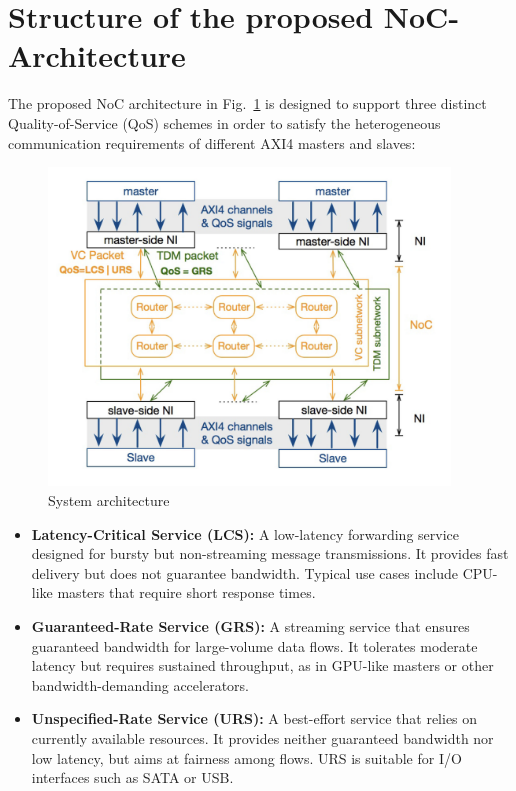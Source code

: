 \section{Structure of the proposed NoC-Architecture}

The proposed NoC architecture in Fig.~\ref{fig:System_Architecture} is designed to support three distinct Quality-of-Service (QoS) schemes in order to satisfy the heterogeneous communication requirements of different AXI4 masters and slaves:

\begin{figure}[htbp]
    \centering
    \includegraphics[width=0.95\textwidth]{img/System Architecture.png}
    \caption{System architecture}
    \label{fig:System_Architecture}
\end{figure}

\begin{itemize}
    \item \textbf{Latency-Critical Service (LCS):}\label{LCS} A low-latency forwarding service designed for bursty but non-streaming message transmissions. It provides fast delivery but does not guarantee bandwidth. Typical use cases include CPU-like masters that require short response times.
    \item \textbf{Guaranteed-Rate Service (GRS):}\label{GRS} A streaming service that ensures guaranteed bandwidth for large-volume data flows. It tolerates moderate latency but requires sustained throughput, as in GPU-like masters or other bandwidth-demanding accelerators.
    \item \textbf{Unspecified-Rate Service (URS):}\label{URS} A best-effort service that relies on currently available resources. It provides neither guaranteed bandwidth nor low latency, but aims at fairness among flows. URS is suitable for I/O interfaces such as SATA or USB.
\end{itemize}

